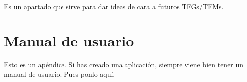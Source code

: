 \documentclass[a4paper, 12pt]{book}
\begin{document}
Es un apartado que sirve para dar ideas de cara a futuros TFGs/TFMs.



\cleardoublepage
\appendix
\chapter{Manual de usuario}
\label{app:manual}

Esto es un apéndice.
Si has creado una aplicación, siempre viene bien tener un manual de usuario.
Pues ponlo aquí.


\cleardoublepage


\end{document}
